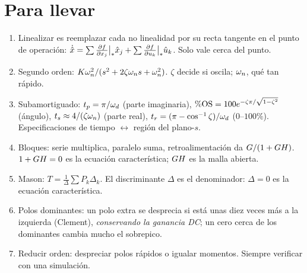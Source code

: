 \section{Para llevar}
\label{sec:so-cierre}

\begin{parallevar}
\begin{enumerate}
  \item Linealizar es reemplazar cada no linealidad por su recta tangente en el punto de operación: $\dot{\hat{x}}=\sum\frac{\partial f}{\partial x_j}\big|_\ast\hat{x}_j+\sum\frac{\partial f}{\partial u_k}\big|_\ast\hat{u}_k$. Solo vale cerca del punto.
  \item Segundo orden: $K\omega_n^2/(s^2+2\zeta\omega_n s+\omega_n^2)$. $\zeta$ decide si oscila; $\omega_n$, qué tan rápido.
  \item Subamortiguado: $t_p=\pi/\omega_d$ (parte imaginaria), $\%\mathrm{OS}=100e^{-\zeta\pi/\sqrt{1-\zeta^2}}$ (ángulo), $t_s\approx4/(\zeta\omega_n)$ (parte real), $t_r=(\pi-\cos^{-1}\zeta)/\omega_d$ ($0$--$100\%$). Especificaciones de tiempo $\leftrightarrow$ región del plano-$s$.
  \item Bloques: serie multiplica, paralelo suma, retroalimentación da $G/(1+GH)$. $1+GH=0$ es la ecuación característica; $GH$ es la malla abierta.
  \item Mason: $T=\frac1\Delta\sum P_k\Delta_k$. El discriminante $\Delta$ es el denominador: $\Delta=0$ es la ecuación característica.
  \item Polos dominantes: un polo extra se desprecia si está unas diez veces más a la izquierda (Clement), \emph{conservando la ganancia DC}; un cero cerca de los dominantes cambia mucho el sobrepico.
  \item Reducir orden: despreciar polos rápidos o igualar momentos. Siempre verificar con una simulación.
\end{enumerate}
\end{parallevar}

